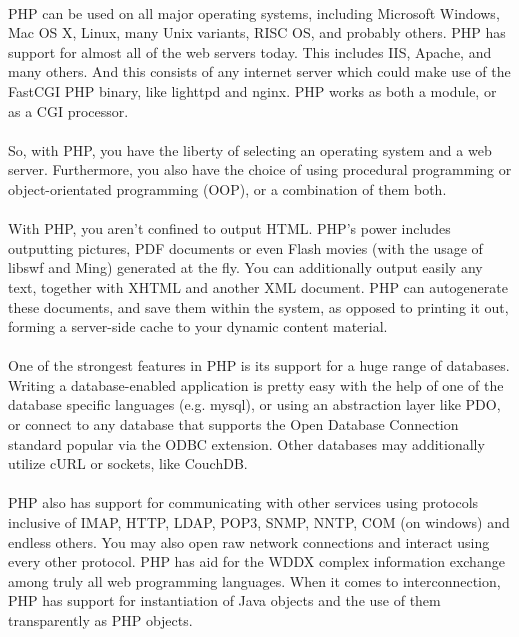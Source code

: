 \documentclass[../thesis.tex]{subfiles}
\begin{document}
\paragraph{}
PHP can be used on all major operating systems, including Microsoft Windows, Mac OS X, Linux, many Unix variants, RISC OS, and probably others. PHP has support for almost all of the web servers today. This includes IIS, Apache, and many others. And this consists of any internet server which could make use of the FastCGI PHP binary, like lighttpd and nginx. PHP works as both a module, or as a CGI processor.
\paragraph{}
So, with PHP, you have the liberty of selecting an operating system and a web server. Furthermore, you also have the choice of using procedural programming or object-orientated programming (OOP), or a combination of them both.
\paragraph{}
With PHP, you aren't confined to output HTML. PHP's power includes outputting pictures, PDF documents or even Flash movies (with the usage of libswf and Ming) generated at the fly. You can additionally output easily any text, together with XHTML and another XML document. PHP can autogenerate these documents, and save them within the system, as opposed to printing it out, forming a server-side cache to your dynamic content material.
\paragraph{}
One of the strongest features in PHP is its support for a huge range of databases. Writing a database-enabled application is pretty easy with the help of one of the database specific languages (e.g. mysql), or using an abstraction layer like PDO, or connect to any database that supports the Open Database Connection standard popular via the ODBC extension. Other databases may additionally utilize cURL or sockets, like CouchDB.
\paragraph{}
PHP also has support for communicating with other services using protocols inclusive of IMAP, HTTP, LDAP, POP3, SNMP, NNTP, COM (on windows) and endless others. You may also open raw network connections and interact using every other protocol. PHP has aid for the WDDX complex information exchange among truly all web programming languages. When it comes to interconnection, PHP has support for instantiation of Java objects and the use of them transparently as PHP objects.
\end{document}
